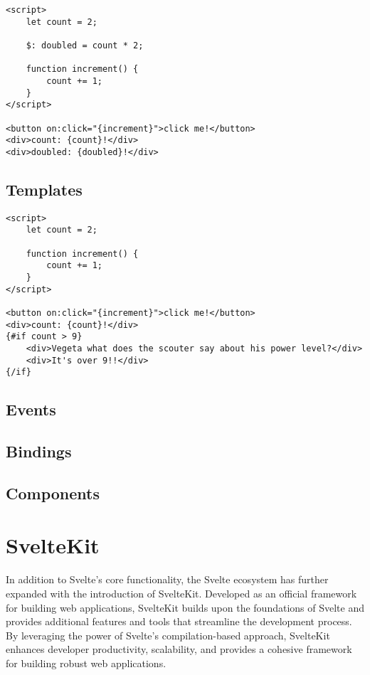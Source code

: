 \begin{verbatim}
<script>
    let count = 2;

    $: doubled = count * 2;

    function increment() {
        count += 1;
    }
</script>

<button on:click="{increment}">click me!</button>
<div>count: {count}!</div>
<div>doubled: {doubled}!</div>
\end{verbatim}


\subsection{Templates}

\begin{verbatim}
<script>
    let count = 2;

    function increment() {
        count += 1;
    }
</script>

<button on:click="{increment}">click me!</button>
<div>count: {count}!</div>
{#if count > 9}
    <div>Vegeta what does the scouter say about his power level?</div>
    <div>It's over 9!!</div>
{/if}
\end{verbatim}


\subsection{Events}

\subsection{Bindings}

\subsection{Components}

\section{SvelteKit}
\label{sec:sveltekit}

In addition to Svelte's core functionality, the Svelte ecosystem has further expanded with the introduction of SvelteKit. Developed as an official framework for building web applications, SvelteKit builds upon the foundations of Svelte and provides additional features and tools that streamline the development process. By leveraging the power of Svelte's compilation-based approach, SvelteKit enhances developer productivity, scalability, and provides a cohesive framework for building robust web applications.

